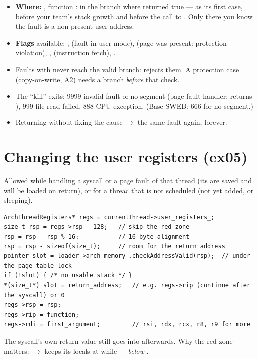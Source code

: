 \begin{itemize}
\item \textbf{Where:} , function : in the branch
  where  returned true --- as its first case, before your team's stack
  growth and before the call to . Only there you know the fault is a non-present
  user address.
\item \textbf{Flags} available: ,  (fault in user mode),
   (page was present: protection violation), ,
   (instruction fetch), .
\item Faults with  never reach the valid branch: 
  rejects them. A protection case (copy-on-write, A2) needs a branch \emph{before} that check.
\item The ``kill'' exits: 9999 invalid fault or no segment (page fault handler; 
  returns ), 999 file read failed, 888 CPU exception. (Base SWEB: 666 for no segment.)
\item Returning without fixing the cause $\to$ the same fault again, forever.
\end{itemize}

\section{Changing the user registers (ex05)}
\label{sec:registers}

Allowed while handling a syscall or a page fault of that thread (its
 are saved and will be loaded on return), or for a thread that is
not scheduled (not yet added, or sleeping).

\begin{lstlisting}[style=cpp]
ArchThreadRegisters* regs = currentThread->user_registers_;
size_t rsp = regs->rsp - 128;   // skip the red zone
rsp = rsp - rsp % 16;           // 16-byte alignment
rsp = rsp - sizeof(size_t);     // room for the return address
pointer slot = loader->arch_memory_.checkAddressValid(rsp);  // under the page-table lock
if (!slot) { /* no usable stack */ }
*(size_t*) slot = return_address;   // e.g. regs->rip (continue after the syscall) or 0
regs->rsp = rsp;
regs->rip = function;
regs->rdi = first_argument;         // rsi, rdx, rcx, r8, r9 for more
\end{lstlisting}

The syscall's own return value still goes into  afterwards. Why the red zone matters:
 $\to$  keeps its locals at  while  --- \emph{below} .

